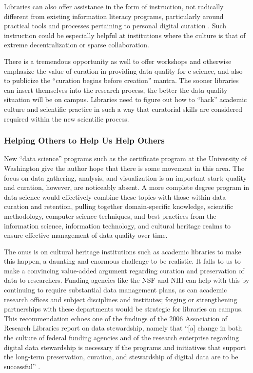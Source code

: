 \documentclass[jou,12pt]{apa6}
\begin{document}
Libraries can also offer assistance in the form of instruction, not
radically different from existing information literacy programs,
particularly around practical tools and processes pertaining to
personal digital curation \cite{williams:lifecycle}. Such instruction
could be especially helpful at institutions where the culture is that
of extreme decentralization or sparse collaboration.

There is a tremendous opportunity as well to offer workshops and
otherwise emphasize the value of curation in providing data quality
for e-science, and also to publicize the ``curation begins before
creation'' mantra. The sooner libraries can insert themselves into the
research process, the better the data quality situation will be on
campus. Libraries need to figure out how to ``hack'' academic culture
and scientific practice in such a way that curatorial skills are
considered required within the new scientific process.

\subsubsection{Helping Others to Help Us Help Others}

New ``data science'' programs such as the certificate program at the
University of Washington \cite{uw:datascience} give the author hope
that there is some movement in this area. The focus on data gathering,
analysis, and visualization is an important start; quality and
curation, however, are noticeably absent. A more complete degree
program in data science would effectively combine these topics with
those within data curation and retention, pulling together
domain-specific knowledge, scientific methodology, computer science
techniques, and best practices from the information science,
information technology, and cultural heritage realms to ensure
effective management of data quality over time.

The onus is on cultural heritage institutions such as academic
libraries to make this happen, a daunting and enormous challenge to be
realistic. It falls to us to make a convincing value-added argument
regarding curation and preservation of data to researchers. Funding
agencies like the NSF and NIH can help with this by continuing to
require substantial data management plans, as can academic research
offices and subject disciplines and institutes; forging or
strengthening partnerships with these departments would be strategic
for libraries on campus. This recommendation echoes one of the
findings of the 2006 Association of Research Libraries report on data
stewardship, namely that ``[a] change in both the culture of federal
funding agencies and of the research enterprise regarding digital data
stewardship is necessary if the programs and initiatives that support
the long-term preservation, curation, and stewardship of digital data
are to be successful'' \cite{arl:stewardship}.
\end{document}
